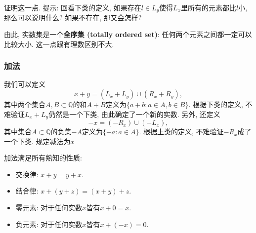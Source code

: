 \begin{exercise}{}
证明这一点. 提示: 回看下类的定义, 如果存在$l\in L_y$使得$L_x$里所有的元素都比$l$小, 那么可以说明什么? 如果不存在, 那又会怎样?
\end{exercise}

由此, 实数集是一个\textbf{全序集 (totally ordered set)}: 任何两个元素之间都一定可以比较大小. 这一点跟有理数区别不大.

\subsubsection{加法}

我们可以定义
$$
x+y=(L_x+L_y)\cup(R_x+R_y),
$$
其中两个集合$A,B\subset\mathbb{Q}$的和$A+B$定义为$\{a+b:a\in A, b\in B\}$. 根据下类的定义, 不难验证$L_x+L_y$仍然是一个下类, 由此确定了一个新的实数. 另外, 还定义
$$
-x=(-R_x)\cup(-L_x),
$$
其中集合$A\subset\mathbb{Q}$的负集$-A$定义为$\{-a:a\in A\}$. 根据上类的定义, 不难验证$-R_x$成了一个下类. 规定减法为$x$

加法满足所有熟知的性质:

\begin{itemize}
\item 交换律: $x+y=y+x$.
\item 结合律: $x+(y+z)=(x+y)+z$.
\item 零元素: 对于任何实数$x$皆有$x+0=x$.
\item 负元素: 对于任何实数$x$皆有$x+(-x)=0$.
\end{itemize}